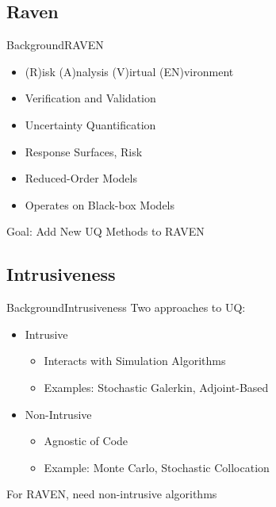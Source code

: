 \documentclass{beamer}
\begin{document}
\subsection{Raven}
\begin{frame}{Background}{RAVEN}\vspace{-20pt}
  \begin{itemize}
    \item (R)isk (A)nalysis (V)irtual (EN)vironment
    \item Verification and Validation
    \item Uncertainty Quantification
    \item Response Surfaces, Risk
    \item Reduced-Order Models
    \item Operates on Black-box Models
  \end{itemize}
  Goal: Add New UQ Methods to RAVEN
\end{frame}

\subsection{Intrusiveness}
\begin{frame}{Background}{Intrusiveness}\vspace{-20pt}
  Two approaches to UQ:\vspace{10pt}
  \begin{itemize}
    \item Intrusive
       \begin{itemize}
         \item Interacts with Simulation Algorithms
         \item Examples: Stochastic Galerkin, Adjoint-Based
       \end{itemize}
    \item Non-Intrusive
      \begin{itemize}
        \item Agnostic of Code
        \item Example: Monte Carlo, Stochastic Collocation
      \end{itemize}
  \end{itemize}\vspace{10pt}
  For RAVEN, need non-intrusive algorithms
\end{frame}
\end{document}
